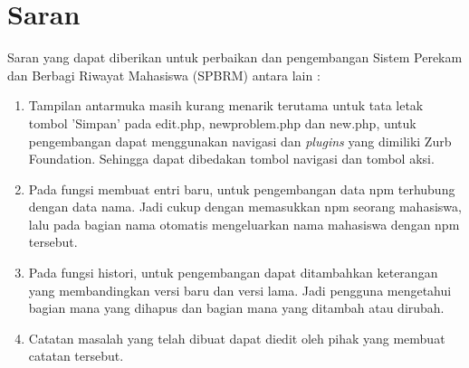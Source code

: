\section{Saran}
\label{sec:saran}
Saran yang dapat diberikan untuk perbaikan dan pengembangan Sistem Perekam dan Berbagi Riwayat Mahasiswa (SPBRM) antara lain :
\begin{enumerate}[(1)]
  \item Tampilan antarmuka masih kurang menarik terutama untuk tata letak tombol 'Simpan' pada edit.php, newproblem.php dan new.php, untuk pengembangan dapat menggunakan navigasi dan {\it plugins} yang dimiliki Zurb Foundation. Sehingga dapat dibedakan tombol navigasi dan tombol aksi.
  \item Pada fungsi membuat entri baru, untuk pengembangan data npm terhubung dengan data nama. Jadi cukup dengan memasukkan npm seorang mahasiswa, lalu pada bagian nama otomatis mengeluarkan nama mahasiswa dengan npm tersebut.
  \item Pada fungsi histori, untuk pengembangan dapat ditambahkan keterangan yang membandingkan versi baru dan versi lama. Jadi pengguna mengetahui bagian mana yang dihapus dan bagian mana yang ditambah atau dirubah.
  \item Catatan masalah yang telah dibuat dapat diedit oleh pihak yang membuat catatan tersebut.
\end{enumerate}